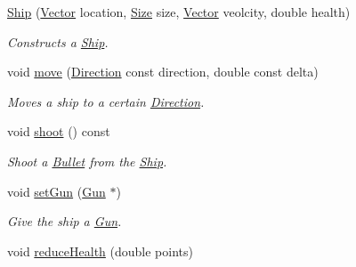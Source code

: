 \begin{DoxyCompactItemize}
\item 
\hypertarget{classty_lib_1_1_ship_a521153fb0cf42422deeedcb4ef1d6635}{}\hyperlink{classty_lib_1_1_ship_a521153fb0cf42422deeedcb4ef1d6635}{Ship} (\hyperlink{classty_lib_1_1_vector}{Vector} location, \hyperlink{classty_lib_1_1_size}{Size} size, \hyperlink{classty_lib_1_1_vector}{Vector} veolcity, double health)\label{classty_lib_1_1_ship_a521153fb0cf42422deeedcb4ef1d6635}

\begin{DoxyCompactList}\small\item\em Constructs a \hyperlink{classty_lib_1_1_ship}{Ship}. \end{DoxyCompactList}\item 
\hypertarget{classty_lib_1_1_ship_ad789777ad2702571160301f5e4c0d5b5}{}void \hyperlink{classty_lib_1_1_ship_ad789777ad2702571160301f5e4c0d5b5}{move} (\hyperlink{classty_lib_1_1_direction}{Direction} const direction, double const delta)\label{classty_lib_1_1_ship_ad789777ad2702571160301f5e4c0d5b5}

\begin{DoxyCompactList}\small\item\em Moves a ship to a certain \hyperlink{classty_lib_1_1_direction}{Direction}. \end{DoxyCompactList}\item 
\hypertarget{classty_lib_1_1_ship_abee6d6d9ad48832df6d93e46d4deec6a}{}void \hyperlink{classty_lib_1_1_ship_abee6d6d9ad48832df6d93e46d4deec6a}{shoot} () const \label{classty_lib_1_1_ship_abee6d6d9ad48832df6d93e46d4deec6a}

\begin{DoxyCompactList}\small\item\em Shoot a \hyperlink{classty_lib_1_1_bullet}{Bullet} from the \hyperlink{classty_lib_1_1_ship}{Ship}. \end{DoxyCompactList}\item 
\hypertarget{classty_lib_1_1_ship_a414c0b9c3de8e86eb5be64a3d18e89f6}{}void \hyperlink{classty_lib_1_1_ship_a414c0b9c3de8e86eb5be64a3d18e89f6}{set\+Gun} (\hyperlink{classty_lib_1_1_gun}{Gun} $\ast$)\label{classty_lib_1_1_ship_a414c0b9c3de8e86eb5be64a3d18e89f6}

\begin{DoxyCompactList}\small\item\em Give the ship a \hyperlink{classty_lib_1_1_gun}{Gun}. \end{DoxyCompactList}\item 
\hypertarget{classty_lib_1_1_ship_a4c8d23b18ac70976e68e8892705580c3}{}void \hyperlink{classty_lib_1_1_ship_a4c8d23b18ac70976e68e8892705580c3}{reduce\+Health} (double points)\label{classty_lib_1_1_ship_a4c8d23b18ac70976e68e8892705580c3}


\end{DoxyCompactItemize}
